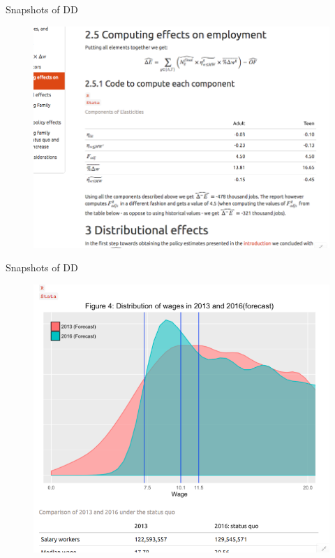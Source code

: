 \documentclass{beamer}
\begin{document}
\begin{frame}[plain]{Snapshots of DD\hyperlink{demo}{\beamerbutton{}}}
\vspace{-2em}
\begin{figure}[h!]
\centering
\hspace{-5em} \includegraphics[scale = 0.28]{../Images/Screen_Shot4}
\hyperlink{demo}{\beamerbutton{}}
\end{figure}	
\end{frame}

\begin{frame}[plain]{Snapshots of DD\hyperlink{demo}{\beamerbutton{}}}
\vspace{-2em}
\begin{figure}[h!]
\centering
\hspace{-5em} \includegraphics[scale = 0.28]{../Images/Screen_Shot5}
\hyperlink{demo}{\beamerbutton{}}
\end{figure}	
\end{frame}
\end{document}
